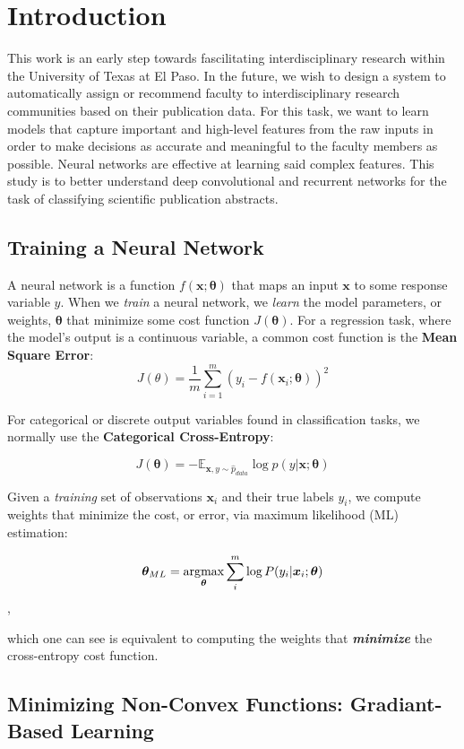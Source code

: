 
\chapter{Introduction}
This work is an early step towards fascilitating interdisciplinary research within the University of Texas at El Paso.
In the future, we wish to design a system to automatically assign or recommend faculty to
interdisciplinary research communities based on their publication data. For this task, we want to learn models that capture
important and high-level features from the raw inputs in order to make decisions as accurate and meaningful to the faculty members as possible.
Neural networks are effective at learning said complex features. This study is to better understand
deep convolutional and recurrent networks for the task of classifying scientific publication abstracts.

\section{Training a Neural Network}
A neural network is a function $f(\bm{x};\bm{\theta})$ that maps an input $\bm{x}$ to some response variable $y$. When we \textit{train} a
neural network, we \textit{learn} the model parameters, or weights, $\bm{\theta}$ that minimize some cost function $J(\bm{\theta})$.
For a regression task, where the model's output is a continuous variable, a common cost function is the \textbf{Mean Square Error}:
\[J(\theta) = \frac{1}{m}\sum_{i=1}^{m}(y_{i} - f(\bm{x}_{i};\bm{\theta}))^{2}\]

For categorical or discrete output variables found in classification tasks, we normally use the \textbf{Categorical Cross-Entropy}:

\[J(\bm{\theta}) = -\mathbb{E}_{\bm{x},y \sim \hat p_{data}} \log \textit{p}(y|\bm{x};\bm{\theta})\]

Given a \textit{training} set of observations $\bm{x}_i$ and their true labels $y_i$, we compute weights that minimize the cost, or error, via
maximum likelihood (ML) estimation:

\[\bm{\theta}_{ML} = \operatorname*{\arg\!\max}_{\bm{\theta}} \sum_{i}^{m} \log P(y_{i}|\bm{x}_{i};\bm{\theta})\],

which one can see is equivalent to computing the weights that \textbf{\textit{minimize}} the cross-entropy cost function.


\section{Minimizing Non-Convex Functions: Gradiant-Based Learning}

